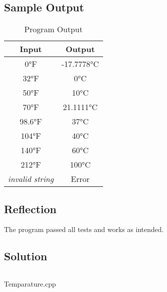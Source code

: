     \subsection*{Sample Output}
        \begin{table}[H]
            \centering
            \begin{tabular}{c c}
                \hline
                \textbf{Input} & \textbf{Output} \\
                \hline
                0°F & -17.7778°C \\
                32°F & 0°C \\
                50°F & 10°C \\
                70°F & 21.1111°C \\
                98.6°F & 37°C \\
                104°F & 40°C \\
                140°F & 60°C \\
                212°F & 100°C \\
                \textit{invalid string} & Error \\
                \hline
            \end{tabular}
            \caption{Program Output}
        \end{table}

    \subsection*{Reflection}
        The program passed all tests and works as intended.
        
    \subsection*{Solution}
        \begin{listing}[H]
            \inputminted[firstline=6]{cpp}{../Tasks/02-Temperature/Temperature.cpp}
            \caption{Temparature.cpp}
        \end{listing}